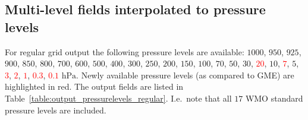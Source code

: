 \subsection{Multi-level fields interpolated to pressure levels}

\newcommand{\pressurelevelsTriangular}{$1000$, $950$, $850$, $700$, $500$, $300$ $\mathrm{hPa}$}

\newcommand{\pressurelevelsRegular}{$1000$, $950$, $925$, $900$, $850$, $800$, $700$, $600$, $500$, $400$, $300$, $250$, $200$, $150$, $100$, 
$70$, $50$, $30$, \textcolor{red}{$20$}, $10$, \textcolor{red}{$7$}, $5$, \textcolor{red}{$3$}, \textcolor{red}{$2$}, \textcolor{red}{$1$}, 
\textcolor{red}{$0.3$}, \textcolor{red}{$0.1$} $\mathrm{hPa}$}

For regular grid output the following pressure levels are available: \pressurelevelsRegular. 
Newly available pressure levels (as compared to GME) are highlighted in red. 
The output fields are listed in Table~\ref{table:output_pressurelevels_regular}.
I.e.\ note that all $17$ WMO standard pressure levels are included.

